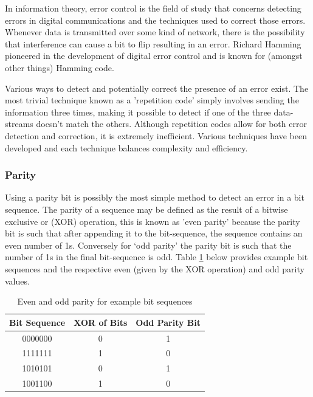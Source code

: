 In information theory, error control is the field of study that concerns detecting errors in digital communications and the techniques used to correct those errors. Whenever data is transmitted over some kind of network, there is the possibility that interference can cause a bit to flip resulting in an error. Richard Hamming pioneered in the development of digital error control and is known for (amongst other things) Hamming code.

Various ways to detect and potentially correct the presence of an error exist. The most trivial technique known as a 'repetition code' simply involves sending the information three times, making it possible to detect if one of the three data-streams doesn't match the others. Although repetition codes allow for both error detection and correction, it is extremely inefficient. Various techniques have been developed and each technique balances complexity and efficiency.

\subsubsection{Parity}
Using a parity bit is possibly the most simple method to detect an error in a bit sequence. The parity of a sequence may be defined as the result of a bitwise exclusive or (XOR) operation, this is known as 'even parity' because the parity bit is such that after appending it to the bit-sequence, the sequence contains an even number of 1s. Conversely for `odd parity' the parity bit is such that the number of 1s in the final bit-sequence is odd. Table \ref{tbl:party_examples} below provides example bit sequences and the respective even (given by the XOR operation) and odd parity values.

\begin{table}[H]
	\centering
	\begin{tabular}{ccc}
		\hline
		\multicolumn{1}{l}{\textbf{Bit Sequence}} & \textbf{XOR of Bits} & \multicolumn{1}{l}{\textbf{Odd Parity Bit}} \\ \hline
		0000000 & 0 & 1 \\ \hline
		1111111 & 1 & 0 \\ \hline
		1010101 & 0 & 1 \\ \hline
		1001100 & 1 & 0 \\ \hline
	\end{tabular}
	\caption{Even and odd parity for example bit sequences}
	\label{tbl:party_examples}
\end{table}

